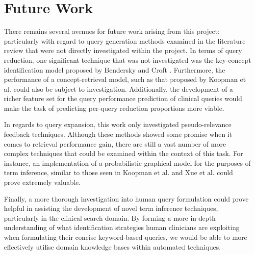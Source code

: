 \documentclass[a4paper]{report}
\begin{document}
\section{Future Work}
There remains several avenues for future work arising from this project; particularly with regard to query generation methods examined in the literature review that were not directly investigated within the project. In terms of query reduction, one significant technique that was not investigated was the key-concept identification model proposed by Bendersky and Croft \cite{Bendersky:2008:DKC:1390334.1390419}. Furthermore, the performance of a concept-retrieval model, such as that proposed by Koopman et al.\cite{Koopman2011AEHRC--QUT-at-T} could also be subject to investigation. Additionally, the development of a richer feature set for the query performance prediction of clinical queries would make the task of predicting per-query reduction proportions more viable.

In regards to query expansion, this work only investigated pseudo-relevance feedback techniques. Although these methods showed some promise when it comes to retrieval performance gain, there are still a vast number of more complex techniques that could be examined within the context of this task. For instance, an implementation of a probabilistic graphical model for the purposes of term inference, similar to those seen in Koopman et al.\cite{Koopman2015Information-Ret} and Xue et al.\cite{Xue:2010:IVQ:1871437.1871572} could prove extremely valuable.

Finally, a more thorough investigation into human query formulation could prove helpful in assisting the development of novel term inference techniques, particularly in the clinical search domain. By forming a more in-depth understanding of what identification strategies human clinicians are exploiting when formulating their concise keyword-based queries, we would be able to more effectively utilise domain knowledge bases within automated techniques. 




\end{document}
